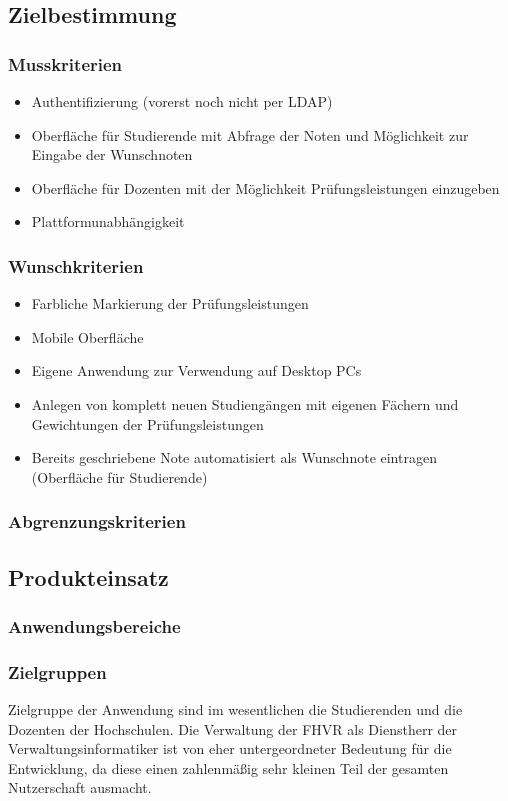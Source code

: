 \documentclass[12pt,a4paper,parskip]{scrreprt}
\begin{document}
\subsection{Zielbestimmung}
\subsubsection{Musskriterien}
\begin{itemize}
\item Authentifizierung (vorerst noch nicht per LDAP)
\item Oberfläche für Studierende mit Abfrage der Noten und Möglichkeit zur Eingabe der Wunschnoten
\item Oberfläche für Dozenten mit der Möglichkeit Prüfungsleistungen einzugeben
\item Plattformunabhängigkeit
\end{itemize}
\subsubsection{Wunschkriterien}
\begin{itemize}
\item Farbliche Markierung der Prüfungsleistungen
\item Mobile Oberfläche
\item Eigene Anwendung zur Verwendung auf Desktop PCs
\item Anlegen von komplett neuen Studiengängen mit eigenen Fächern und Gewichtungen der Prüfungsleistungen
\item Bereits geschriebene Note automatisiert als Wunschnote eintragen (Oberfläche für Studierende)
\end{itemize}
\subsubsection{Abgrenzungskriterien}
\subsection{Produkteinsatz}
\subsubsection{Anwendungsbereiche}
\subsubsection{Zielgruppen}
Zielgruppe der Anwendung sind im wesentlichen die Studierenden und die Dozenten der Hochschulen. Die Verwaltung der FHVR als Dienstherr der Verwaltungsinformatiker ist von eher untergeordneter Bedeutung für die Entwicklung, da diese einen zahlenmäßig sehr kleinen Teil der gesamten Nutzerschaft ausmacht.
\end{document}
